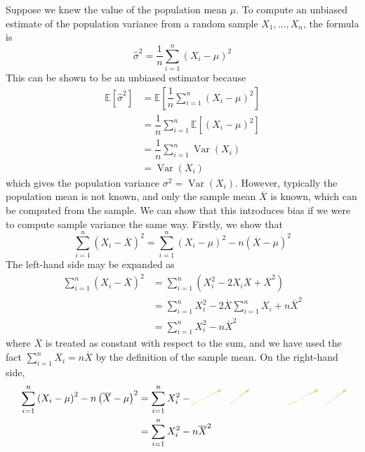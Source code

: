 \documentclass[11pt]{report} %
\begin{document}
Suppose we knew the value of the population mean $\mu$. To compute an unbiased estimate of the population variance from a random sample $X_{1}, \dots, X_{n}$, the formula is
\begin{equation}
\hat{\sigma}^{2} = \dfrac{1}{n}\sum_{i = 1}^{n}{\left(X_{i} - \mu\right)^{2}}
\end{equation}
This can be shown to be an unbiased estimator because
\begin{align}
\mathbb{E}\left[\hat{\sigma}^{2}\right] &= \mathbb{E}\left[\dfrac{1}{n}\sum_{i = 1}^{n}{\left(X_{i} - \mu\right)^{2}}\right] \\
&= \dfrac{1}{n}\sum_{i = 1}^{n}\mathbb{E}\left[\left(X_{i} - \mu\right)^{2}\right] \\
&= \dfrac{1}{n}\sum_{i = 1}^{n}\operatorname{Var}\left(X_{i}\right) \\
&= \operatorname{Var}\left(X_{i}\right)
\end{align}
which gives the population variance $\sigma^{2} = \operatorname{Var}\left(X_{i}\right)$. However, typically the population mean is not known, and only the sample mean $\overline{X}$ is known, which can be computed from the sample. We can show that this introduces bias if we were to compute sample variance the same way. Firstly, we show that
\begin{equation}
\sum_{i = 1}^{n}{\left(X_i - \overline{X}\right)^{2}} = \sum_{i = 1}^{n}{\left(X_i - \mu\right)^{2}} - n\left(\overline{X} - \mu\right)^{2}
\end{equation}
The left-hand side may be expanded as
\begin{align}
\sum_{i = 1}^{n}\left(X_i - \overline{X}\right)^{2} &= \sum_{i = 1}^{n}\left(X_{i}^{2} - 2X_{i}\overline{X} + \overline{X}^{2}\right) \\
&= \sum_{i = 1}^{n}X_{i}^{2} - 2\overline{X}\sum_{i = 1}^{n}X_{i} + n\overline{X}^{2} \\
&= \sum_{i = 1}^{n}X_{i}^{2} - n\overline{X}^{2}
\end{align}
where $\overline{X}$ is treated as constant with respect to the sum, and we have used the fact $\sum_{i = 1}^{n}X_{i} = n\overline{X}$ by the definition of the sample mean. On the right-hand side,
\begin{align}
\sum_{i = 1}^{n}{\left(X_i - \mu\right)^{2}} - n\left(\overline{X} - \mu\right)^{2} &= \sum_{i=1}^{n}{X_{i}^{2}} - \green\cancelto{}{\black 2\mu n \overline{X}}\black + \green\cancelto{}{\black n\mu^{2}}\black - n\overline{X}^{2} + \green\cancelto{}{\black 2n\overline{X}\mu}\black - \green\cancelto{}{\black n\mu^{2}}\black \\
&= \sum_{i = 1}^{n}X_{i}^{2} - n\overline{X}^{2}
\end{align}
\end{document}
